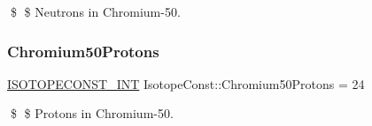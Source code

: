 \$ \$ Neutrons in Chromium-\/50. \mbox{\label{group___isotope_const-_chromium-_cr50_ga6a2fe59f296741b26a19830ab2b1bc15}} 
\subsubsection{\texorpdfstring{Chromium50\+Protons}{Chromium50Protons}}
{\footnotesize\ttfamily \mbox{\hyperlink{group___isotope_const-_macros_ga5f18360b3e99483a35c32d789e62621c}{I\+S\+O\+T\+O\+P\+E\+C\+O\+N\+S\+T\+\_\+\+I\+NT}} Isotope\+Const\+::\+Chromium50\+Protons = 24}

\$ \$ Protons in Chromium-\/50. 